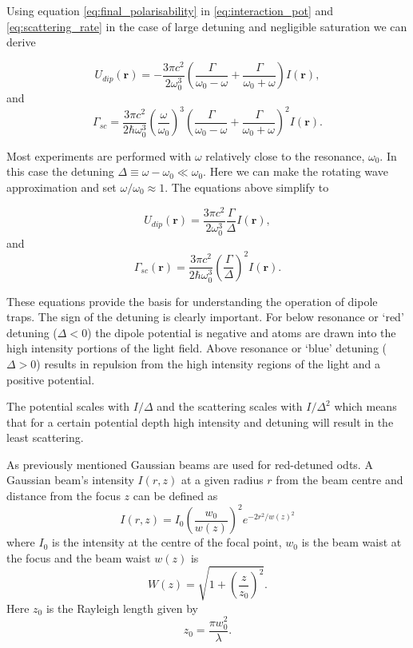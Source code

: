 Using equation \ref{eq:final_polarisability} in \ref{eq:interaction_pot} and \ref{eq:scattering_rate} in the case of large detuning and negligible saturation we can derive

\begin{equation}\label{eq:potential}
U_{dip}(\boldsymbol r) = -\frac{3\pi c^2}{2\omega_0^3}\left(\frac{\Gamma}{\omega_0-\omega} + \frac{\Gamma}{\omega_0+\omega}\right) I(\boldsymbol r),
\end{equation}
and
\begin{equation}\label{eq:scattering}
\Gamma_{sc} = \frac{3\pi c^2}{2\hbar\omega_0^3} \left(\frac{\omega}{\omega_0}\right)^3 \left(\frac{\Gamma}{\omega_0 - \omega} + \frac{\Gamma}{\omega_0+\omega}\right)^2 I(\boldsymbol r).
\end{equation}

Most experiments are performed with $\omega$ relatively close to the resonance, $\omega_0$. In this case the detuning $\Delta\equiv \omega - \omega_0 \ll \omega_0$. Here we can make the rotating wave approximation and set $\omega/\omega_0\approx 1$. The equations above simplify to

\begin{equation}\label{eq:simple_potential}
U_{dip}(\boldsymbol{r}) = \frac{3\pi c^2}{2 \omega_0^3} \frac{\Gamma}{\Delta} I(\boldsymbol{r}),
\end{equation}
and
\begin{equation}\label{eq:simple_scattering}
\Gamma_{sc} (\boldsymbol r ) = \frac{3\pi c^2}{2\hbar\omega_0^3} \left( \frac{\Gamma}{\Delta} \right)^2 I(\boldsymbol r ).
\end{equation}

These equations provide the basis for understanding the operation of dipole traps. The sign of the detuning is clearly important. For below resonance or `red' detuning ($\Delta < 0$) the dipole potential is negative and atoms are drawn into the high intensity portions of the light field. Above resonance or `blue' detuning ($\Delta > 0$) results in repulsion from the high intensity regions of the light and a positive potential.

The potential scales with $I/\Delta$ and the scattering scales with $I/\Delta^2$ which means that for a certain potential depth high intensity and detuning will result in the least scattering.

As previously mentioned Gaussian beams are used for red-detuned \glspl{odt}. A Gaussian beam's intensity $I(r, z)$ at a given radius $r$ from the beam centre and distance from the focus $z$ can be defined as\cite{saleh_fundamentals_2007}
\begin{equation}
I(r, z) = I_0 \left( \frac{w_0}{w(z)}\right)^2 e^{-2r^2/w(z)^2}
\end{equation}
where $I_0$ is the intensity at the centre of the focal point, $w_0$ is the beam waist at the focus and the beam waist $w(z)$ is
\begin{equation}
W(z) = \sqrt{1 + \left(\frac{z}{z_0} \right)^2}.
\end{equation}
Here $z_0$ is the Rayleigh length given by
\begin{equation}
z_0 = \frac{\pi w_0^2}{\lambda}.
\end{equation}

